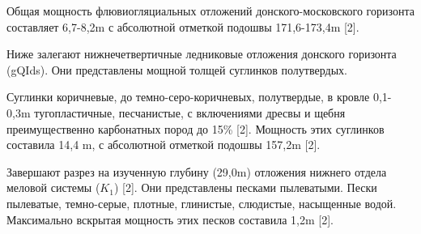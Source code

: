 Общая мощность флювиогляциальных отложений донского-московского горизонта составляет 6,7-8,2\si{\meter} с абсолютной отметкой подошвы 171,6-173,4\si{\meter} [2].

Ниже залегают нижнечетвертичные ледниковые отложения донского горизонта (gQIds). Они представлены мощной толщей суглинков полутвердых.

Суглинки коричневые, до темно-серо-коричневых, полутвердые, в кровле 0,1-0,3\si{\meter} тугопластичные, песчанистые, с включениями дресвы и щебня преимущественно карбонатных пород до 15\% [2]. Мощность этих суглинков составила 14,4 \si{\meter}, с абсолютной отметкой подошвы 157,2\si{\meter} [2].

Завершают разрез на изученную глубину (29,0\si{\meter}) отложения нижнего отдела меловой системы ($K_1$) [2]. Они представлены песками пылеватыми. Пески пылеватые, темно-серые, плотные, глинистые, слюдистые, насыщенные водой. Максимально вскрытая мощность этих песков составила 1,2\si{\meter} [2].
